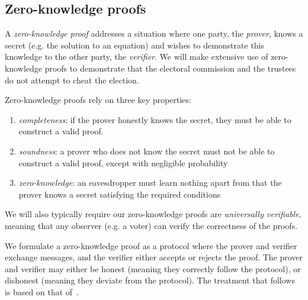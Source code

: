 \documentclass[12pt,a4paper]{article}
\theoremstyle{definition}
\begin{document}
\subsection{Zero-knowledge proofs}
A \textit{zero-knowledge proof} addresses a situation where one party, the \textit{prover}, knows a secret (e.g. the solution to an equation) and wishes to demonstrate this knowledge to the other party, the \textit{verifier}. We will make extensive use of zero-knowledge proofs to demonstrate that the electoral commission and the trustees do not attempt to cheat the election.

Zero-knowledge proofs rely on three key properties:
\begin{enumerate}
    \item \textit{completeness}: if the prover honestly knows the secret, they must be able to construct a valid proof.
    \item \textit{soundness}: a prover who does not know the secret must not be able to construct a valid proof, except with negligible probability
    \item \textit{zero-knowledge}: an eavesdropper must learn nothing apart from that the prover knows a secret satisfying the required conditions
\end{enumerate}
We will also typically require our zero-knowledge proofs are \textit{universally verifiable}, meaning that any observer (e.g. a voter) can verify the correctness of the proofs.

We formulate a zero-knowledge proof as a protocol where the prover and verifier exchange messages, and the verifier either accepts or rejects the proof. The prover and verifier may either be honest (meaning they correctly follow the protocol), or dishonest (meaning they deviate from the protocol). The treatment that follows is based on that of~\cite{boneh2020graduate}.
\end{document}
